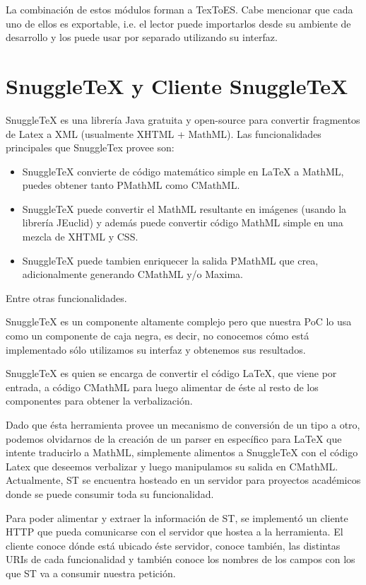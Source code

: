 La combinación de estos módulos forman a TexToES. Cabe mencionar que cada uno de ellos es exportable, i.e. el lector puede importarlos desde su ambiente de desarrollo y los puede usar por separado utilizando su interfaz.

\section{SnuggleTeX y Cliente SnuggleTeX}

SnuggleTeX\cite{3} es una librería Java gratuita y open-source para convertir fragmentos de Latex a XML (usualmente XHTML + MathML). Las funcionalidades principales que SnuggleTex provee son:

\begin{itemize}
\item SnuggleTeX convierte de código matemático simple en LaTeX a MathML, puedes obtener tanto PMathML como CMathML.
\item SnuggleTeX puede convertir el MathML resultante en imágenes (usando la librería JEuclid) y además puede convertir código MathML simple en una mezcla de XHTML y CSS.
\item SnuggleTeX puede tambien enriquecer la salida PMathML que crea, adicionalmente generando CMathML y/o Maxima.
\end{itemize}

Entre otras funcionalidades.

SnuggleTeX es un componente altamente complejo pero que nuestra PoC lo usa como un componente de caja negra, es decir, no conocemos cómo está implementado sólo utilizamos su interfaz y obtenemos sus resultados.

SnuggleTeX es quien se encarga de convertir el código LaTeX\cite{4}, que viene por entrada, a código CMathML para luego alimentar de éste al resto de los componentes para obtener la verbalización.

Dado que ésta herramienta provee un mecanismo de conversión de un tipo a otro, podemos olvidarnos de la creación de un parser en específico para LaTeX que intente traducirlo a MathML, simplemente alimentos a SnuggleTeX con el código Latex que deseemos verbalizar y luego manipulamos su salida en CMathML. Actualmente, ST se encuentra hosteado en un servidor para proyectos académicos donde se puede consumir toda su funcionalidad.

Para poder alimentar y extraer la información de ST, se implementó un cliente HTTP que pueda comunicarse con el servidor que hostea a la herramienta. El cliente conoce dónde está ubicado éste servidor, conoce también, las distintas URIs de cada funcionalidad y también conoce los nombres de los campos con los que ST va a consumir nuestra petición.

